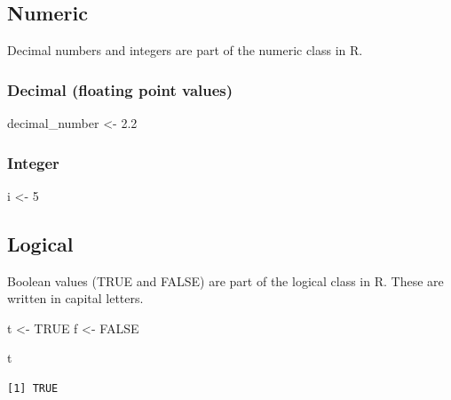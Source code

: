 \documentclass[
  letterpaper,
  DIV=11,
  numbers=noendperiod]{scrreprt}
\newenvironment{Shaded}{\begin{snugshade}}{\end{snugshade}}
\newcommand{\ConstantTok}[1]{\textcolor[rgb]{0.56,0.35,0.01}{#1}}
\newcommand{\DecValTok}[1]{\textcolor[rgb]{0.68,0.00,0.00}{#1}}
\newcommand{\FloatTok}[1]{\textcolor[rgb]{0.68,0.00,0.00}{#1}}
\newcommand{\NormalTok}[1]{\textcolor[rgb]{0.00,0.23,0.31}{#1}}
\newcommand{\OtherTok}[1]{\textcolor[rgb]{0.00,0.23,0.31}{#1}}
\begin{document}
\subsection{Numeric}\label{numeric}

Decimal numbers and integers are part of the numeric class in R.

\subsubsection{Decimal (floating point
values)}\label{decimal-floating-point-values}

\begin{Shaded}
\begin{Highlighting}[]
\NormalTok{decimal\_number }\OtherTok{\textless{}{-}} \FloatTok{2.2}
\end{Highlighting}
\end{Shaded}

\subsubsection{Integer}\label{integer}

\begin{Shaded}
\begin{Highlighting}[]
\NormalTok{i }\OtherTok{\textless{}{-}} \DecValTok{5}
\end{Highlighting}
\end{Shaded}

\subsection{Logical}\label{logical}

Boolean values (TRUE and FALSE) are part of the logical class in R.
These are written in capital letters.

\begin{Shaded}
\begin{Highlighting}[]
\NormalTok{t }\OtherTok{\textless{}{-}} \ConstantTok{TRUE}
\NormalTok{f }\OtherTok{\textless{}{-}} \ConstantTok{FALSE}
\end{Highlighting}
\end{Shaded}

\begin{Shaded}
\begin{Highlighting}[]
\NormalTok{t}
\end{Highlighting}
\end{Shaded}

\begin{verbatim}
[1] TRUE
\end{verbatim}
\end{document}
